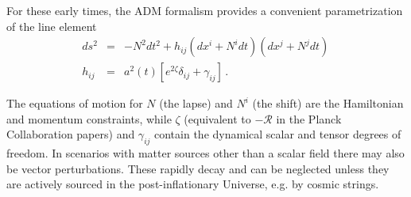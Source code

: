 

For these early times, the ADM formalism \cite{ADM}
provides a convenient parametrization of the line element
\begin{eqnarray}
\label{eq:metric}
ds^2&=&-N^2dt^2 +h_{ij}(dx^i+N^idt)(dx^j+N^jdt)\,\nonumber\\
h_{ij}&=&a^2(t)[e^{2\zeta}\delta_{ij}+\gamma_{ij}]\,.
\end{eqnarray}

The equations of motion for $N$ (the lapse) and $N^i$ (the shift) are the Hamiltonian and momentum constraints, while $\zeta$ (equivalent to $-\mathcal{R}$ in the Planck Collaboration papers) and $\gamma_{ij}$ contain the dynamical scalar and tensor degrees of freedom. In scenarios with matter sources other than a scalar field there may also be vector perturbations. These rapidly decay and can be neglected unless they are actively sourced in the post-inflationary Universe, e.g. by cosmic strings.

